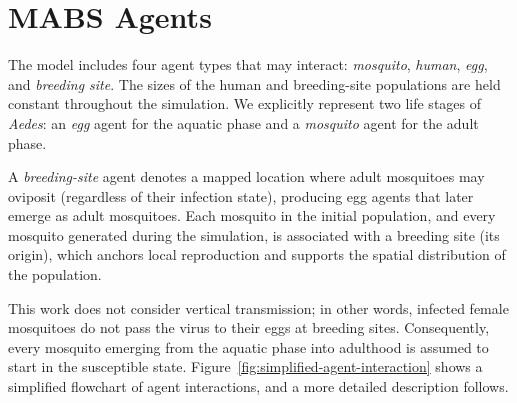 \section{MABS Agents} \label{sec:agents}

The model includes four agent types that may interact: \emph{mosquito}, \emph{human}, \emph{egg}, and \emph{breeding site}. The sizes of the human and breeding-site populations are held constant throughout the simulation. We explicitly represent two life stages of \emph{Aedes}: an \emph{egg} agent for the aquatic phase and a \emph{mosquito} agent for the adult phase.

A \emph{breeding-site} agent denotes a mapped location where adult mosquitoes may oviposit (regardless of their infection state), producing egg agents that later emerge as adult mosquitoes. Each mosquito in the initial population, and every mosquito generated during the simulation, is associated with a breeding site (its origin), which anchors local reproduction and supports the spatial distribution of the population.

This work does not consider vertical transmission; in other words, infected female mosquitoes do not pass the virus to their eggs at breeding sites. Consequently, every mosquito emerging from the aquatic phase into adulthood is assumed to start in the susceptible state. Figure~\ref{fig:simplified-agent-interaction} shows a simplified flowchart of agent interactions, and a more detailed description follows.

